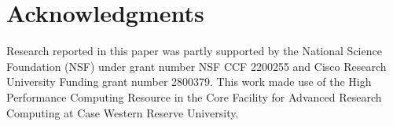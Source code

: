 \section*{Acknowledgments}

Research reported in this paper was partly supported by the National
Science Foundation (NSF) under grant number NSF CCF 2200255 and Cisco Research
University Funding grant number 2800379. This work made use of the High
Performance Computing Resource in the Core Facility for Advanced Research
Computing at Case Western Reserve University.

\clearpage